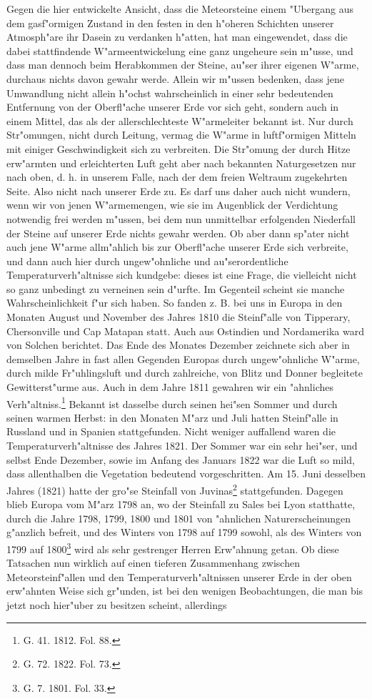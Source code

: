 \documentclass[a4paper, 8pt, oneside, polutonikogreek, german]{article}
\begin{document}
Gegen die hier entwickelte Ansicht, dass die Meteorsteine einem "Ubergang aus dem gasf"ormigen Zustand in den festen in den h"oheren Schichten unserer Atmosph"are ihr Dasein zu verdanken h"atten, hat man eingewendet, dass die dabei stattfindende W"armeentwickelung eine ganz ungeheure sein m"usse, und dass man dennoch beim Herabkommen der Steine, au"ser ihrer eigenen W"arme, durchaus nichts davon gewahr werde. Allein wir m"ussen bedenken, dass jene Umwandlung nicht allein h"ochst wahrscheinlich in einer sehr bedeutenden Entfernung von der Oberfl"ache unserer Erde vor sich geht, sondern auch in einem Mittel, das als der allerschlechteste W"armeleiter bekannt ist. Nur durch Str"omungen, nicht durch Leitung, vermag die W"arme in luftf"ormigen Mitteln mit einiger Geschwindigkeit sich zu verbreiten. Die Str"omung der durch Hitze erw"armten und erleichterten Luft geht aber nach bekannten Naturgesetzen nur nach oben, d. h. in unserem Falle, nach der dem freien Weltraum zugekehrten Seite. Also nicht nach unserer Erde zu. Es darf uns daher auch nicht wundern, wenn wir von jenen W"armemengen, wie sie im Augenblick der Verdichtung notwendig frei werden m"ussen, bei dem nun unmittelbar erfolgenden Niederfall der Steine auf unserer Erde nichts gewahr werden. Ob aber dann sp"ater nicht auch jene W"arme allm"ahlich bis zur Oberfl"ache unserer Erde sich verbreite, und dann auch hier durch ungew"ohnliche und au"serordentliche Temperaturverh"altnisse sich kundgebe: dieses ist eine Frage, die vielleicht nicht so ganz unbedingt zu verneinen sein d"urfte. Im Gegenteil scheint sie manche Wahrscheinlichkeit f"ur sich haben. So fanden z. B. bei uns in Europa in den Monaten August und November des Jahres 1810 die Steinf"alle von Tipperary, Chersonville und Cap Matapan statt. Auch aus Ostindien und Nordamerika ward von Solchen berichtet. Das Ende des Monates Dezember zeichnete sich aber in demselben Jahre in fast allen Gegenden Europas durch ungew"ohnliche W"arme, durch milde Fr"uhlingsluft und durch zahlreiche, von Blitz und Donner begleitete Gewitterst"urme aus. Auch in dem Jahre 1811 gewahren wir ein "ahnliches Verh"altniss.\footnote{G. 41. 1812. Fol. 88.} Bekannt ist dasselbe durch seinen hei"sen Sommer und durch seinen warmen Herbst: in den Monaten M"arz und Juli hatten Steinf"alle in Russland und in Spanien stattgefunden. Nicht weniger auffallend waren die Temperaturverh"altnisse des Jahres 1821. Der Sommer war ein sehr hei"ser, und selbst Ende Dezember, sowie im Anfang des Januars 1822 war die Luft so mild, dass allenthalben die Vegetation bedeutend vorgeschritten. Am 15. Juni desselben Jahres (1821) hatte der gro"se Steinfall von Juvinas\footnote{G. 72. 1822. Fol. 73.} stattgefunden. Dagegen blieb Europa vom M"arz 1798 an, wo der Steinfall zu Sales bei Lyon statthatte, durch die Jahre 1798, 1799, 1800 und 1801 von "ahnlichen Naturerscheinungen g"anzlich befreit, und des Winters von 1798 auf 1799 sowohl, als des Winters von 1799 auf 1800\footnote{G. 7. 1801. Fol. 33.} wird als sehr gestrenger Herren Erw"ahnung getan. Ob diese Tatsachen nun wirklich auf einen tieferen Zusammenhang zwischen Meteorsteinf"allen und den Temperaturverh"altnissen unserer Erde in der oben erw"ahnten Weise sich gr"unden, ist bei den wenigen Beobachtungen, die man bis jetzt noch hier"uber zu besitzen scheint, allerdings 
\end{document}
